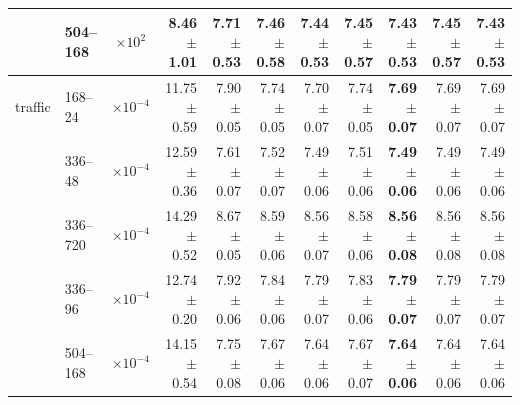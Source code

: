 \begin{table}[htbp]
\begin{tabular}{llcrrrrrrr|r}
 & 504--168 & $\times 10^{2}$ & 8.46 $\pm$ 1.01 & 7.71 $\pm$ 0.53 & 7.46 $\pm$ 0.58 & 7.44 $\pm$ 0.53 & 7.45 $\pm$ 0.57 & \textbf{7.43 $\pm$ 0.53} & 7.45 $\pm$ 0.57 & 7.43 $\pm$ 0.53 \\
\midrule
traffic & 168--24 & $\times 10^{-4}$ & 11.75 $\pm$ 0.59 & 7.90 $\pm$ 0.05 & 7.74 $\pm$ 0.05 & 7.70 $\pm$ 0.07 & 7.74 $\pm$ 0.05 & \textbf{7.69 $\pm$ 0.07} & 7.69 $\pm$ 0.07 & 7.69 $\pm$ 0.07 \\
 & 336--48 & $\times 10^{-4}$ & 12.59 $\pm$ 0.36 & 7.61 $\pm$ 0.07 & 7.52 $\pm$ 0.07 & 7.49 $\pm$ 0.06 & 7.51 $\pm$ 0.06 & \textbf{7.49 $\pm$ 0.06} & 7.49 $\pm$ 0.06 & 7.49 $\pm$ 0.06 \\
 & 336--720 & $\times 10^{-4}$ & 14.29 $\pm$ 0.52 & 8.67 $\pm$ 0.05 & 8.59 $\pm$ 0.06 & 8.56 $\pm$ 0.07 & 8.58 $\pm$ 0.06 & \textbf{8.56 $\pm$ 0.08} & 8.56 $\pm$ 0.08 & 8.56 $\pm$ 0.08 \\
 & 336--96 & $\times 10^{-4}$ & 12.74 $\pm$ 0.20 & 7.92 $\pm$ 0.06 & 7.84 $\pm$ 0.06 & 7.79 $\pm$ 0.07 & 7.83 $\pm$ 0.06 & \textbf{7.79 $\pm$ 0.07} & 7.79 $\pm$ 0.07 & 7.79 $\pm$ 0.07 \\
 & 504--168 & $\times 10^{-4}$ & 14.15 $\pm$ 0.54 & 7.75 $\pm$ 0.08 & 7.67 $\pm$ 0.06 & 7.64 $\pm$ 0.06 & 7.67 $\pm$ 0.07 & \textbf{7.64 $\pm$ 0.06} & 7.64 $\pm$ 0.06 & 7.64 $\pm$ 0.06 \\
\bottomrule
\end{tabular}
\end{table}

